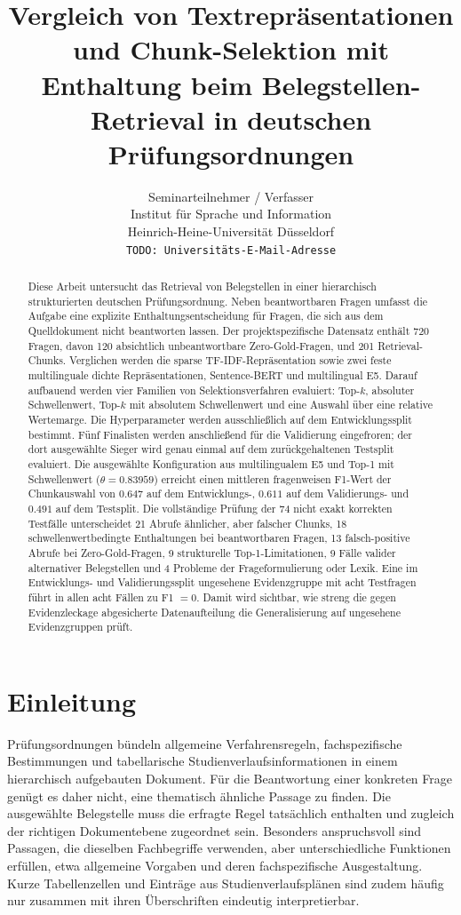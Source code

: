 \documentclass[11pt]{article}
\title{Vergleich von Textrepräsentationen und Chunk-Selektion mit Enthaltung beim Belegstellen-Retrieval in deutschen Prüfungsordnungen}
\author{Seminarteilnehmer / Verfasser \\
  Institut für Sprache und Information \\
  Heinrich-Heine-Universität Düsseldorf \\
  \texttt{TODO: Universitäts-E-Mail-Adresse}}
\begin{document}
\maketitle

\begin{abstract}
Diese Arbeit untersucht das Retrieval von Belegstellen in einer hierarchisch strukturierten deutschen Prüfungsordnung. Neben beantwortbaren Fragen umfasst die Aufgabe eine explizite Enthaltungsentscheidung für Fragen, die sich aus dem Quelldokument nicht beantworten lassen. Der projektspezifische Datensatz enthält 720 Fragen, davon 120 absichtlich unbeantwortbare Zero-Gold-Fragen, und 201 Retrieval-Chunks. Verglichen werden die sparse TF-IDF-Repräsentation sowie zwei feste multilinguale dichte Repräsentationen, Sentence-BERT und multilingual E5. Darauf aufbauend werden vier Familien von Selektionsverfahren evaluiert: Top-$k$, absoluter Schwellenwert, Top-$k$ mit absolutem Schwellenwert und eine Auswahl über eine relative Wertemarge. Die Hyperparameter werden ausschließlich auf dem Entwicklungssplit bestimmt. Fünf Finalisten werden anschließend für die Validierung eingefroren; der dort ausgewählte Sieger wird genau einmal auf dem zurückgehaltenen Testsplit evaluiert. Die ausgewählte Konfiguration aus multilingualem E5 und Top-1 mit Schwellenwert ($\theta=0.83959$) erreicht einen mittleren fragenweisen F1-Wert der Chunkauswahl von $0.647$ auf dem Entwicklungs-, $0.611$ auf dem Validierungs- und $0.491$ auf dem Testsplit. Die vollständige Prüfung der 74 nicht exakt korrekten Testfälle unterscheidet 21 Abrufe ähnlicher, aber falscher Chunks, 18 schwellenwertbedingte Enthaltungen bei beantwortbaren Fragen, 13 falsch-positive Abrufe bei Zero-Gold-Fragen, 9 strukturelle Top-1-Limitationen, 9 Fälle valider alternativer Belegstellen und 4 Probleme der Frageformulierung oder Lexik. Eine im Entwicklungs- und Validierungssplit ungesehene Evidenzgruppe mit acht Testfragen führt in allen acht Fällen zu F1 $=0$. Damit wird sichtbar, wie streng die gegen Evidenzleckage abgesicherte Datenaufteilung die Generalisierung auf ungesehene Evidenzgruppen prüft.
\end{abstract}


\section{Einleitung}

Prüfungsordnungen bündeln allgemeine Verfahrensregeln, fachspezifische Bestimmungen und tabellarische Studienverlaufsinformationen in einem hierarchisch aufgebauten Dokument. Für die Beantwortung einer konkreten Frage genügt es daher nicht, eine thematisch ähnliche Passage zu finden. Die ausgewählte Belegstelle muss die erfragte Regel tatsächlich enthalten und zugleich der richtigen Dokumentebene zugeordnet sein. Besonders anspruchsvoll sind Passagen, die dieselben Fachbegriffe verwenden, aber unterschiedliche Funktionen erfüllen, etwa allgemeine Vorgaben und deren fachspezifische Ausgestaltung. Kurze Tabellenzellen und Einträge aus Studienverlaufsplänen sind zudem häufig nur zusammen mit ihren Überschriften eindeutig interpretierbar.
\end{document}
